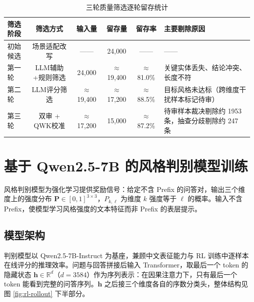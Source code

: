 \documentclass[fontset=fandol,type=master,campus=shenzhen,etitleauto=true]{hithesisbook}
\begin{document}
\begin{table}[htbp]
\centering
\caption{三轮质量筛选逐轮留存统计}
\label{tab:style-data-dist}
\small
\setlength{\tabcolsep}{4pt}
\renewcommand{\arraystretch}{1.1}
\begin{tabular}{l c c c c p{4.2cm}}
\toprule
\textbf{筛选阶段} & \textbf{筛选方式} & \textbf{输入量} & \textbf{留存量} & \textbf{留存率} & \textbf{主要剔除原因} \\
\midrule
初始候选   & 场景适配改写  &  ——   & 24{,}000 &  ——    &  —— \\
第一轮     & LLM辅助+规则筛选 & 24{,}000 & $\approx$19{,}400 & $\approx$81.0\% & 关键实体丢失、结论冲突、长度不符 \\
第二轮     & LLM评分筛选   & $\approx$19{,}400 & $\approx$17{,}200 & $\approx$88.5\% & 目标风格未达标（跨维度干扰样本标记待审） \\
第三轮     & 双审 + QWK校准 & $\approx$17{,}200 & 15{,}000 & $\approx$87.2\% & 待审样本裁决剔除约 1953 条，抽查分歧剔除约 247 条 \\
\bottomrule
\end{tabular}
\end{table}

\section{基于 Qwen2.5-7B 的风格判别模型训练}\label{ux57faux4e8e-qwen2.5-7b-ux7684ux98ceux683cux5224ux522bux6a21ux578bux8badux7ec3}

风格判别模型为强化学习提供奖励信号：给定不含 Prefix 的问答对，输出三个维度上的强度分布 $\mathbf{P} \in [0,1]^{3 \times 3}$，$P_{k,\ell}$ 为维度 $k$ 强度等于 $\ell$ 的概率。输入不含 Prefix，使模型学习风格强度的文本特征而非 Prefix 的表层提示。

\subsection{模型架构}\label{ux6a21ux578bux67b6ux6784ux8bbeux8ba1}

判别模型以 Qwen2.5-7B-Instruct 为基座，兼顾中文表征能力与 RL 训练中逐样本在线评分的推理效率。问题与回答拼接后输入 Transformer，取最后一个 token 的隐藏状态 $\mathbf{h} \in \mathbb{R}^{d}$（$d = 3584$）作为序列表示：在因果注意力下，只有最后一个 token 能看到完整的问答序列。$\mathbf{h}$ 之后接三个维度各自的序数分类头，整体结构见图 \ref{fig:rl-rollout} 下半部分。
\end{document}
